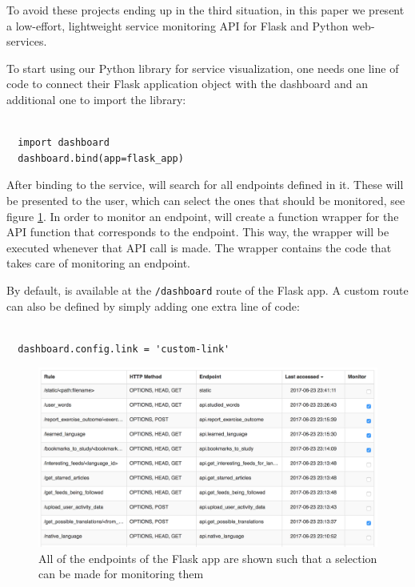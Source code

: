 \documentclass[conference]{IEEEtran}
\begin{document}
To avoid these projects ending up in the third situation, in this paper we present a low-effort, lightweight service monitoring API for Flask and Python web-services.

To start using our Python library for service visualization, one needs one line of code to connect their Flask application object with the dashboard and an additional one to import the library:

\begin{lstlisting}[caption=Configuring the \tool is straightforward,style=custompython]

  import dashboard
  dashboard.bind(app=flask_app)

\end{lstlisting}


After binding to the service, \tool will search for all endpoints defined in it. These will be presented to the user, which can select the ones that should be monitored, see figure \ref{fig:sep}. In order to monitor an endpoint, \tool will create a function wrapper for the API function that corresponds to the endpoint. This way, the wrapper will be executed whenever that API call is made. The wrapper contains the code that takes care of monitoring an endpoint.

By default, \tool is available at the \texttt{/dashboard} route of the Flask app. A custom route can also be defined by simply adding one extra line of code:

\begin{lstlisting}[caption=Configuring the \tool with a custom route for it to be accessed on is straightforward, style=custompython]

  dashboard.config.link = 'custom-link'

  \end{lstlisting}

  \begin{figure}[!ht]
    \centering
    \includegraphics[width=\linewidth]{selecting_endpoints.png}
    \caption{All of the endpoints of the Flask app are shown such that a selection can be made for monitoring them}
    \label{fig:sep}
  \end{figure}
\end{document}
